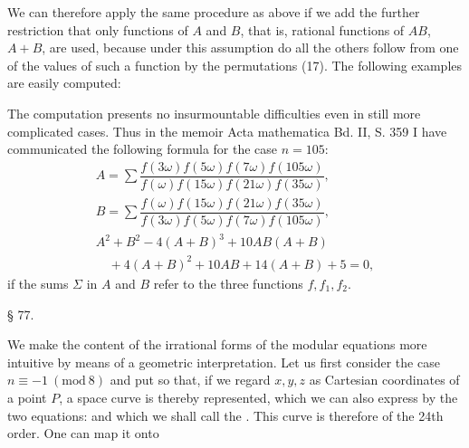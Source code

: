 We can therefore apply the same procedure as above if we add the further
restriction that only  functions of $A$ and $B$, that
is, rational functions of $AB$, $A+B$, are used, because  under this
assumption do all the others follow from one of the values of such a
function by the permutations (17). The following examples are easily
computed:

The computation presents no insurmountable difficulties even in still
more complicated cases. Thus in the memoir Acta mathematica Bd. II,
S. 359 I have communicated the following formula for the case $n = 105$:
\[
\begin{array}{l}
A = \sum \dfrac{f(3\omega)f(5\omega)f(7\omega)f(105\omega)}{f(\omega)f(15\omega)f(21\omega)f(35\omega)}, \\[2ex]
B = \sum \dfrac{f(\omega)f(15\omega)f(21\omega)f(35\omega)}{f(3\omega)f(5\omega)f(7\omega)f(105\omega)}, \\[2ex]
A^2+B^2-4(A+B)^3+10AB(A+B) \\
\quad{}+4(A+B)^2+10AB+14(A+B)+5 = 0,
\end{array}
\]
if the sums $\Sigma$ in $A$ and $B$ refer to the three functions
$f, f_1, f_2$.

\begin{center}
§ 77.\quad {}\\
\end{center}

We make the content of the irrational forms of the modular equations
more intuitive by means of a geometric interpretation. Let us first
consider the case $n \equiv -1 \ (\mathrm{mod}\ 8)$ and put
so that, if we regard $x, y, z$ as Cartesian coordinates of a point
$P$, a space curve is thereby represented, which we can also express
by the two equations:
and which we shall call the . This curve is
therefore of the 24th order. One can map it onto
